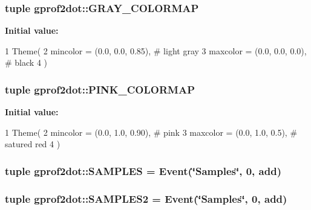 \label{namespacegprof2dot_a3cfb98044f99cfdfb0cef686b3ed3c74}
\hypertarget{namespacegprof2dot_af6ef5bd07ae324a28a57189c326a514b}{
\subsubsection[{GRAY\_\-COLORMAP}]{\setlength{\rightskip}{0pt plus 5cm}tuple {\bf gprof2dot::GRAY\_\-COLORMAP}}}
\label{namespacegprof2dot_af6ef5bd07ae324a28a57189c326a514b}
{\bfseries Initial value:}
\begin{DoxyCode}
1 Theme(
2     mincolor = (0.0, 0.0, 0.85), # light gray
3     maxcolor = (0.0, 0.0, 0.0), # black
4 )
\end{DoxyCode}
\hypertarget{namespacegprof2dot_ac297cc5a9b66874d10fdf32f4fe69417}{
\subsubsection[{PINK\_\-COLORMAP}]{\setlength{\rightskip}{0pt plus 5cm}tuple {\bf gprof2dot::PINK\_\-COLORMAP}}}
\label{namespacegprof2dot_ac297cc5a9b66874d10fdf32f4fe69417}
{\bfseries Initial value:}
\begin{DoxyCode}
1 Theme(
2     mincolor = (0.0, 1.0, 0.90), # pink
3     maxcolor = (0.0, 1.0, 0.5), # satured red
4 )
\end{DoxyCode}
\hypertarget{namespacegprof2dot_a4e4ea28f29d46701235f133af771103f}{
\subsubsection[{SAMPLES}]{\setlength{\rightskip}{0pt plus 5cm}tuple {\bf gprof2dot::SAMPLES} = {\bf Event}(\char`\"{}Samples\char`\"{}, 0, add)}}
\label{namespacegprof2dot_a4e4ea28f29d46701235f133af771103f}
\hypertarget{namespacegprof2dot_a58b6460141073b790688ed1dd4d427ee}{
\subsubsection[{SAMPLES2}]{\setlength{\rightskip}{0pt plus 5cm}tuple {\bf gprof2dot::SAMPLES2} = {\bf Event}(\char`\"{}Samples\char`\"{}, 0, add)}}
